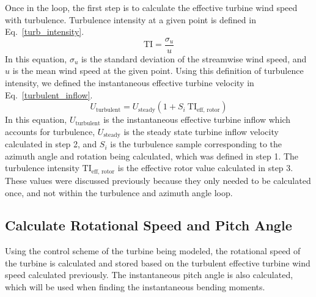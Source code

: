 \documentclass[11pt,letterpaper]{article}
\begin{document}
Once in the loop, the first step is to calculate the effective turbine wind speed with turbulence. Turbulence intensity at a given point is defined in Eq.~\ref{turb_intensity}.
%
\begin{equation}
    \label{turb_intensity}
    \text{TI} = \frac{\sigma_u}{u}
\end{equation}
% 
In this equation, $\sigma_u$ is the standard deviation of the streamwise wind speed, and $u$ is the mean wind speed at the given point. Using this definition of turbulence intensity, we defined the instantaneous effective turbine velocity in Eq.~\ref{turbulent_inflow}.
%
\begin{equation}
    \label{turbulent_inflow}
    U_{\text{turbulent}} = U_{\text{steady}}(1 + S_i ~\text{TI}_{\text{eff, rotor}})
\end{equation}
% 
In this equation, $U_{\text{turbulent}}$ is the instantaneous effective turbine inflow which accounts for turbulence, $U_{\text{steady}}$ is the steady state turbine inflow velocity calculated in step 2, and $S_i$ is the turbulence sample corresponding to the azimuth angle and rotation being calculated, which was defined in step 1. The turbulence intensity $\text{TI}_{\text{eff, rotor}}$ is the effective rotor value calculated in step 3. These values were discussed previously because they only needed to be calculated once, and not within the turbulence and azimuth angle loop.

\subsection{Calculate Rotational Speed and Pitch Angle}
Using the control scheme of the turbine being modeled, the rotational speed of the turbine is calculated and stored based on the turbulent effective turbine wind speed calculated previously. The instantaneous pitch angle is also calculated, which will be used when finding the instantaneous bending moments.
\end{document}

